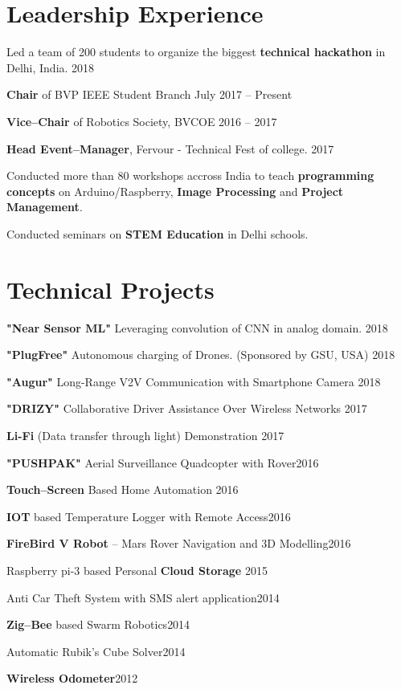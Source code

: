 \section{Leadership Experience}
\begin{innerlist}
    \item Led a team of 200 students to organize the biggest \textbf{technical hackathon} in Delhi, India. \hfill {2018}
    \item \textbf{Chair} of BVP IEEE Student Branch \hfill {July 2017 -- Present}
    \item \textbf{Vice--Chair} of Robotics Society, BVCOE \hfill {2016 -- 2017}
    \item \textbf{Head Event--Manager}, Fervour - Technical Fest of college. \hfill {2017}
    \item Conducted more than 80 workshops accross India to teach \textbf{programming concepts} on Arduino/Raspberry, \textbf{Image Processing} and \textbf{Project Management}.
    \item Conducted seminars on \textbf{STEM Education} in Delhi schools.
\end{innerlist}

\halfblankline

\section{Technical Projects}
\begin{innerlist}
    \item \textbf{"Near Sensor ML"} Leveraging convolution of CNN in analog domain. \hfill {2018}
    \item \textbf{"PlugFree"} Autonomous charging of Drones. (Sponsored by GSU, USA) \hfill {2018}
    \item \textbf{"Augur"} Long-Range V2V Communication with Smartphone Camera \hfill {2018}
    \item \textbf{"DRIZY"} Collaborative Driver Assistance Over Wireless Networks \hfill {2017}
    \item \textbf{Li-Fi} (Data transfer through light) Demonstration \hfill {2017}
    \item \textbf{"PUSHPAK"} Aerial Surveillance Quadcopter with Rover\hfill {2016}
    \item \textbf{Touch--Screen} Based Home Automation \hfill {2016}
    \item \textbf{IOT} based Temperature Logger with Remote Access\hfill {2016}
    \item \textbf{FireBird V Robot} -- Mars Rover Navigation and 3D Modelling\hfill {2016}
    \item Raspberry pi-3 based Personal \textbf{Cloud Storage} \hfill {2015}
    \item Anti Car Theft System with SMS alert application\hfill {2014}
    \item \textbf{Zig--Bee} based Swarm Robotics\hfill {2014}
    \item Automatic Rubik’s Cube Solver\hfill {2014}
    \item \textbf{Wireless Odometer}\hfill {2012}
\end{innerlist}

